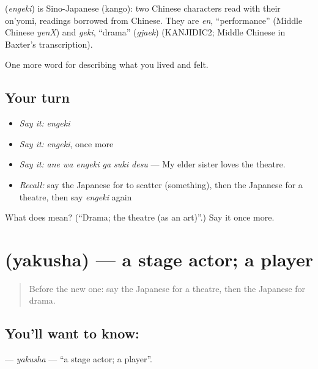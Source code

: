 \begin{cousinweb}
\textbf{} (\emph{engeki}) is Sino-Japanese (kango): two Chinese characters read with their on'yomi, readings borrowed from Chinese. They are \emph{en}, \textquotedblleft{}performance\textquotedblright{} (Middle Chinese \emph{yenX}) and \emph{geki}, \textquotedblleft{}drama\textquotedblright{} (\emph{gjaek}) (KANJIDIC2; Middle Chinese in Baxter's transcription).
\end{cousinweb}

\begin{grammarlens}[title={What you've built}]
One more word for describing what you lived and felt.
\end{grammarlens}

\subsection*{Your turn}
\begin{itemize}
\raggedright
  \item \emph{Say it:} \emph{engeki}
  \item \emph{Say it:} \emph{engeki}, once more
  \item \emph{Say it:} \emph{ane wa engeki ga suki desu} — My elder sister loves the theatre.
  \item \emph{Recall:} say the Japanese for to scatter (something), then the Japanese for a theatre, then say \emph{engeki} again
\end{itemize}

\begin{tcolorbox}[breakable,colback=teal!4,colframe=teal!35!black,title={Before you move on}]
What does  mean? (\textquotedblleft{}Drama; the theatre (as an art)\textquotedblright{}.) Say it once more.
\end{tcolorbox}
\section[\texorpdfstring{\ja{やくしゃ} (yakusha)}{やくしゃ (yakusha)}]{ (yakusha) — a stage actor; a player}

\label{lesson:JA-C502-yakusha}



\begin{quote}
Before the new one: say the Japanese for a theatre, then the Japanese for drama.
\end{quote}

\subsection*{You'll want to know: }
\textbf{} — \emph{yakusha} — \textquotedblleft{}a stage actor; a player\textquotedblright{}.


